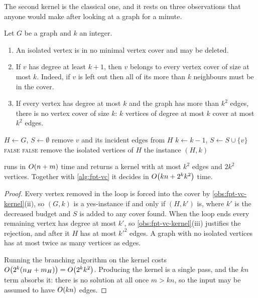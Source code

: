 The second kernel is the classical one, and it rests on three observations that
anyone would make after looking at a graph for a minute.

\begin{observation}\label{obs:fpt-vc-kernel}
Let $G$ be a graph and $k$ an integer.
\begin{enumerate}[label=(\roman*),leftmargin=*]
  \item An isolated vertex is in no minimal vertex cover and may be deleted.
  \item If $v$ has degree at least $k+1$, then $v$ belongs to every vertex cover
        of size at most $k$. Indeed, if $v$ is left out then all of its more
        than $k$ neighbours must be in the cover.
  \item If every vertex has degree at most $k$ and the graph has more than $k^2$
        edges, there is no vertex cover of size $k$: $k$ vertices of degree at
        most $k$ cover at most $k^2$ edges.
\end{enumerate}
\end{observation}

\begin{algorithm}[ht]
\caption{Kernelisation for  }
\label{alg:fpt-vc-kernel}
\begin{algorithmic}[1]
  \State $H \gets G$, \quad $S \gets \emptyset$
    \State remove $v$ and its incident edges from $H$
    \State $k \gets k-1$, \quad $S \gets S \cup \{v\}$
  \EndWhile
   \Return \textsc{false} \EndIf
   \Return \textsc{false} \EndIf
  \State remove the isolated vertices of $H$
  \State \Return the instance $(H,k)$
\end{algorithmic}
\end{algorithm}

\begin{theorem}\label{thm:fpt-vc-kernel}
 runs in $O\!\left(n+m\right)$ time and returns a kernel with at
most $k^2$ edges and $2k^2$ vertices. Together with \cref{alg:fpt-vc} it decides
 in $O\!\left(kn + 2^kk^2\right)$ time.
\end{theorem}

\begin{proof}
Every vertex removed in the loop is forced into the cover by
\cref{obs:fpt-vc-kernel}(ii), so $(G,k)$ is a yes-instance if and only if
$(H,k')$ is, where $k'$ is the decreased budget and $S$ is added to any cover
found. When the loop ends every remaining vertex has degree at most $k'$, so
\cref{obs:fpt-vc-kernel}(iii) justifies the rejection, and after it $H$ has at
most $k'^2$ edges. A graph with no isolated vertices has at most twice as many
vertices as edges.

Running the branching algorithm on the kernel costs
$O\!\left(2^{k}(n_H + m_H)\right) = O\!\left(2^kk^2\right)$. Producing the kernel is a single
pass, and the $kn$ term absorbs it: there is no solution at all once
$m > kn$, so the input may be assumed to have $O\!\left(kn\right)$ edges.
\end{proof}

